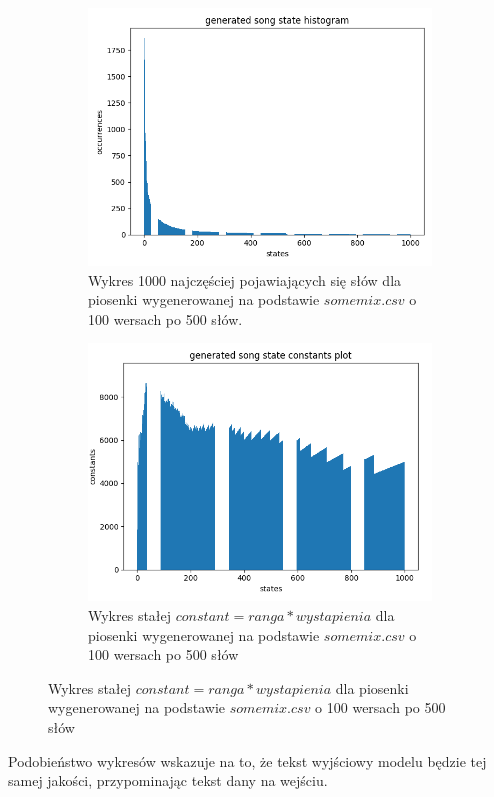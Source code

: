 \documentclass{article}
\begin{document}
\FloatBarrier
\begin{figure}
     \centering
     \begin{subfigure}[b]{0.75\textwidth}
         \centering
         \includegraphics[width=\textwidth]{generated_zipf1}
         \caption{Wykres 1000 najczęściej pojawiających się słów dla piosenki wygenerowanej na podstawie $somemix.csv$ o 100 wersach po 500 słów.}
         \label{fig:mesh1}
     \end{subfigure}
     \hfill
     \begin{subfigure}[b]{0.75\textwidth}
         \centering
         \includegraphics[width=\textwidth]{generated_zipf2}
         \caption{Wykres stałej $constant = ranga * wystapienia$  dla piosenki wygenerowanej na podstawie $somemix.csv$ o 100 wersach po 500 słów}
         \label{fig:mesh1}
     \end{subfigure}
\end{figure}
\FloatBarrier
Podobieństwo wykresów wskazuje na to, że tekst wyjściowy modelu będzie tej samej jakości, przypominając tekst dany na wejściu.
\end{document}
